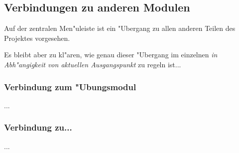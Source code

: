 


\subsection{Verbindungen zu anderen Modulen}

Auf der zentralen Men"uleiste ist ein "Ubergang zu allen anderen Teilen
des Projektes vorgesehen.

Es bleibt aber zu kl"aren, wie genau dieser "Ubergang im einzelnen 
\textit{in Abh"angigkeit von aktuellen Ausgangspunkt} zu regeln ist...
 
\subsubsection{Verbindung zum "Ubungsmodul}

...


\subsubsection{Verbindung zu...}

...













